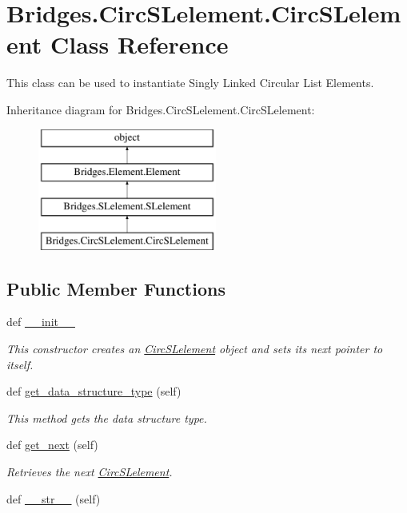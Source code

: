 \hypertarget{class_bridges_1_1_circ_s_lelement_1_1_circ_s_lelement}{}\section{Bridges.\+Circ\+S\+Lelement.\+Circ\+S\+Lelement Class Reference}
\label{class_bridges_1_1_circ_s_lelement_1_1_circ_s_lelement}


This class can be used to instantiate Singly Linked Circular List Elements.  


Inheritance diagram for Bridges.\+Circ\+S\+Lelement.\+Circ\+S\+Lelement\+:\begin{figure}[H]
\begin{center}
\leavevmode
\includegraphics[height=4.000000cm]{class_bridges_1_1_circ_s_lelement_1_1_circ_s_lelement}
\end{center}
\end{figure}
\subsection*{Public Member Functions}
\begin{DoxyCompactItemize}
\item 
def \hyperlink{class_bridges_1_1_circ_s_lelement_1_1_circ_s_lelement_a5e62edf5e21d8f3019905fbeee4bf769}{\+\_\+\+\_\+init\+\_\+\+\_\+}
\begin{DoxyCompactList}\small\item\em This constructor creates an \hyperlink{class_bridges_1_1_circ_s_lelement_1_1_circ_s_lelement}{Circ\+S\+Lelement} object and sets its next pointer to itself. \end{DoxyCompactList}\item 
def \hyperlink{class_bridges_1_1_circ_s_lelement_1_1_circ_s_lelement_ac42fa1f929f264bb006cc36cd90f7341}{get\+\_\+data\+\_\+structure\+\_\+type} (self)
\begin{DoxyCompactList}\small\item\em This method gets the data structure type. \end{DoxyCompactList}\item 
def \hyperlink{class_bridges_1_1_circ_s_lelement_1_1_circ_s_lelement_a5d470152b0f73929a6add1606f8d8d9d}{get\+\_\+next} (self)
\begin{DoxyCompactList}\small\item\em Retrieves the next \hyperlink{class_bridges_1_1_circ_s_lelement_1_1_circ_s_lelement}{Circ\+S\+Lelement}. \end{DoxyCompactList}\item 
def \hyperlink{class_bridges_1_1_circ_s_lelement_1_1_circ_s_lelement_a1b5a00057f745704c4a9eb8babc7398a}{\+\_\+\+\_\+str\+\_\+\+\_\+} (self)
\end{DoxyCompactItemize}
